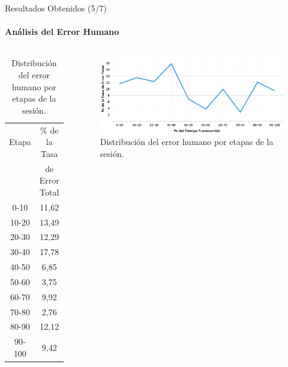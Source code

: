 \begin{frame}{Resultados Obtenidos (5/7)}
\framesubtitle{An\'alisis del Error Humano}

\begin{columns}
\centering
\begin{table}
\tiny
\begin{tabular}{|c|c|}
\hline
    Etapa & \% de la Tasa \\ & de Error Total \\
    \hline
0-10  &  11,62 \\
10-20 &  13,49 \\
20-30 &  12,29 \\
30-40 &  17,78 \\
40-50 &  6,85 \\
50-60 &  3,75 \\
60-70 &  9,92 \\
70-80 &  2,76 \\
80-90 &  12,12 \\
90-100 & 9,42 \\
    \hline
\end{tabular}
\caption{Distribuci\'on del error humano por etapas de la sesi\'on.}
\label{sec:error-tiempo}
\end{table}
\begin{figure}
\centering
\includegraphics[width=1\linewidth]{./graphics/error_tiempo.png}
\caption{Distribuci\'on del error humano por etapas de la sesi\'on.}
\label{figure:gerror-tiempo}
\end{figure}
\end{columns}

\end{frame}

